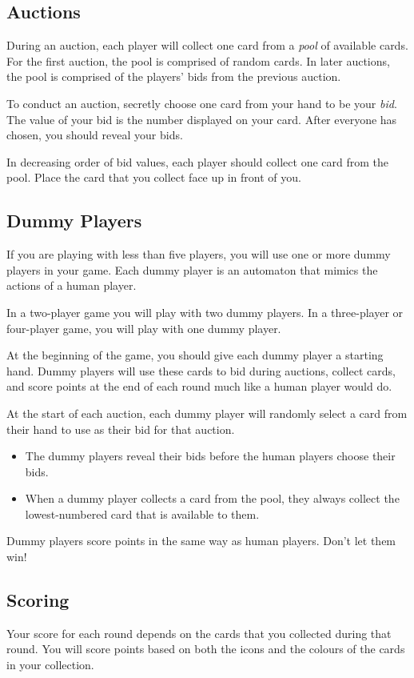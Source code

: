 \documentclass[a6paper, parskip=half, DIV=14, 10pt]{scrartcl}
\begin{document}
\subsection*{Auctions}
During an auction, each player will collect one card from a \emph{pool} of available cards.
For the first auction, the pool is comprised of random cards.
In later auctions, the pool is comprised of the players' bids from the previous auction.

To conduct an auction, secretly choose one card from your hand to be your \emph{bid}.
The value of your bid is the number displayed on your card.
After everyone has chosen, you should reveal your bids.

In decreasing order of bid values, each player should collect one card from the pool.
Place the card that you collect face up in front of you.

\newpage

\subsection*{Dummy Players}
If you are playing with less than five players, you will use one or more dummy players in your game.
Each dummy player is an automaton that mimics the actions of a human player.

In a two-player game you will play with two dummy players. In a three-player or four-player game, you will play with one dummy player.

At the beginning of the game, you should give each dummy player a starting hand. Dummy players will use these cards to bid during auctions, collect cards, and score points at the end of each round much like a human player would do.

At the start of each auction, each dummy player will randomly select a card from their hand to use as their bid for that auction.
\begin{itemize}[leftmargin=*]
\item The dummy players reveal their bids before the human players choose their bids. 
\item When a dummy player collects a card from the pool, they always collect the lowest-numbered card that is available to them.
\end{itemize}
Dummy players score points in the same way as human players. Don't let them win!

\newpage

\subsection*{Scoring}
Your score for each round depends on the cards that you collected during that round.
You will score points based on both the icons and the colours of the cards in your collection.
\end{document}
